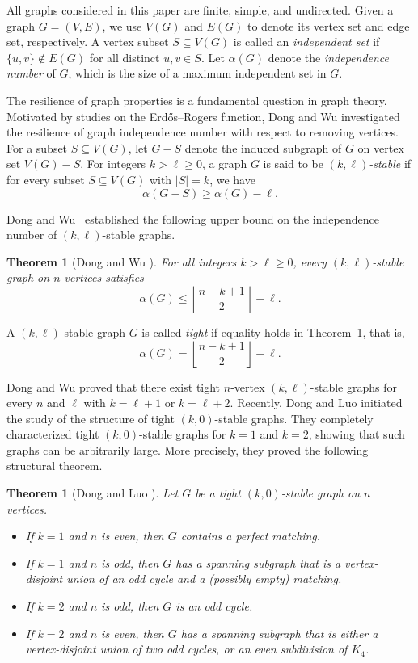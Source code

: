 \def\CTeXPreproc{Created by ctex v0.2.14, don't edit!}\def\CTeXPreproc{Created by ctex v0.2.14, don't edit!}\documentclass[11pt, twoside]{article}
\newtheorem{thm}[lem]{Theorem}
\begin{document}
All graphs considered in this paper are finite, simple, and undirected. Given a graph $G=(V,E)$, we use $V(G)$ and $E(G)$ to denote its vertex set and edge set, respectively. A vertex subset $ S\subseteq V(G) $ is called an \textit{independent set} if $ \{u,v\}\notin E(G) $ for all distinct $ u,v\in S$. Let $\alpha(G)$ denote the \textit{independence number} of $G$, which is the size of a maximum independent set in $G$. 

The resilience of graph properties is a fundamental question in graph theory. Motivated by studies on the Erd\H{o}s--Rogers function, Dong and Wu \cite{DongWu2022} investigated the resilience of graph independence number with respect to removing vertices. For a subset $S\subseteq V(G)$, let $G-S$ denote the induced subgraph of $G$ on vertex set $V(G)- S$. For integers $k > \ell \geq 0$, a graph $G$ is said to be \emph{$(k,\ell)$-stable} if for every subset $S\subseteq V(G)$ with $|S|=k$, we have
\[
	\alpha(G-S) \geq \alpha(G) - \ell.
\]

Dong and Wu~\cite{DongWu2022} established the following upper bound on the independence number of $(k,\ell)$-stable graphs.

\begin{thm}[Dong and Wu \cite{DongWu2022}]\label{thm:DW}
	For all integers $k > \ell \geq 0$, every $(k,\ell)$-stable graph on $n$ vertices satisfies
	$$\alpha(G) \leq \left\lfloor \frac{n-k+1}{2} \right\rfloor + \ell.$$
\end{thm}

A $(k,\ell)$-stable graph $G$ is called \emph{tight} if equality holds in Theorem~\ref{thm:DW}, that is,
$$\alpha(G) = \left\lfloor \frac{n-k+1}{2} \right\rfloor + \ell.$$

Dong and Wu \cite{DongWu2022} proved that there exist tight $n$-vertex $(k,\ell)$-stable graphs for every $n$ and $ \ell $ with $k=\ell+1$ or $k=\ell+2$. Recently, Dong and Luo \cite{DongLuo2024} initiated the study of the structure of tight $(k,0)$-stable graphs. They completely characterized tight $(k,0)$-stable graphs for $k=1$ and $k=2$, showing that such graphs can be arbitrarily large. More precisely, they proved the following structural theorem.

\begin{thm}[Dong and Luo \cite{DongLuo2024}]\label{thm:DL12}
	Let $G$ be a tight $(k,0)$-stable graph on $n$ vertices.
	\begin{itemize}
		\item[(a)] If $k=1$ and $n$ is even, then $G$ contains a perfect matching.
		\item[(b)] If $k=1$ and $n$ is odd, then $G$ has a spanning subgraph that is a vertex-disjoint union of an odd cycle and a (possibly empty) matching.
		\item[(c)] If $k=2$ and $n$ is odd, then $G$ is an odd cycle.
		\item[(d)] If $k=2$ and $n$ is even, then $G$ has a spanning subgraph that is either a vertex-disjoint union of two odd cycles, or an even subdivision of $K_4$.
	\end{itemize}
\end{thm}
\end{document}
